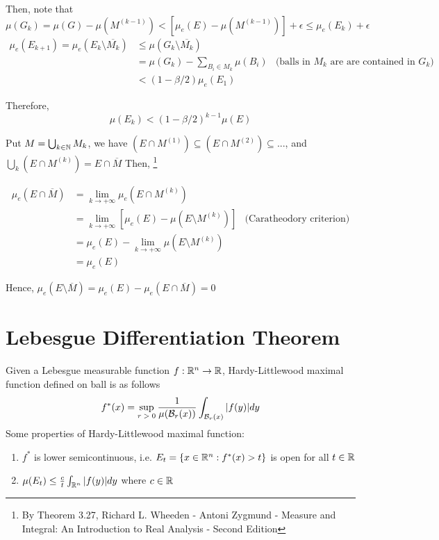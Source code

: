 \documentclass{report}
\begin{document}
Then, note that $\mu(G_k) = \mu(G) - \mu(M^{(k-1)}) < [\mu_e(E) - \mu(M^{(k-1)})] + \epsilon \leq \mu_e(E_k) + \epsilon$
\begin{align*}
    \mu_e(E_{k+1}) = \mu_e\left( E_k \setminus \overline{M_k} \right)
    &\leq \mu\left( G_k \setminus \overline{M_k} \right) \\
    &= \mu(G_k) - \sum_{B_i \in M_k} \mu(B_i) &\text{(balls in $M_k$ are are contained in $G_k$)} \\
    &< (1 - \beta/2) \mu_e(E_1)
\end{align*}

Therefore,
\[
    \mu(E_k) < (1 - \beta/2)^{k-1} \mu(E)
\]

Put $M = \bigcup_{k \in \mathbb{N}} M_k$, we have $(E \cap M^{(1)}) \subseteq (E \cap M^{(2)}) \subseteq ...$, and $\bigcup_{k} (E \cap M^{(k)}) = E \cap \overline{M}$
Then, \footnote{By Theorem 3.27, Richard L. Wheeden - Antoni Zygmund - Measure and Integral: An Introduction to Real Analysis - Second Edition}

\begin{align*}
    \mu_e(E \cap \overline{M})
    &= \lim_{k \to +\infty} \mu_e(E \cap M^{(k)}) \\
    &= \lim_{k \to +\infty} [\mu_e(E) - \mu(E \setminus M^{(k)})] &\text{(Caratheodory criterion)} \\
    &= \mu_e(E) - \lim_{k \to +\infty}  \mu(E \setminus M^{(k)}) \\
    &= \mu_e(E)
\end{align*}

Hence, $\mu_e(E \setminus \overline{M}) = \mu_e(E) - \mu_e(E \cap \overline{M}) = 0$


\section{Lebesgue Differentiation Theorem}

\begin{lemma}
    Given a Lebesgue measurable function $f: \mathbb{R}^n \to \mathbb{R}$, Hardy-Littlewood maximal function defined on ball is as follows
    \[
        f^*(x) = \sup_{\text{$r > 0$}} \frac{1}{\mu(\mathcal{B}_r(x))} \int_{\mathcal{B}_r(x)} |f(y)|dy
    \]
    Some properties of Hardy-Littlewood maximal function:
    \begin{enumerate}
        \item $f^*$ is lower semicontinuous, i.e. $E_t = \{x \in \mathbb{R}^n: f^*(x) > t \}$ is open for all $t \in \mathbb{R}$
        \item $\mu(E_t) \leq \frac{c}{t} \int_{\mathbb{R}^n} |f(y)|dy$ where $c \in \mathbb{R}$ 
    \end{enumerate}
\end{lemma}
\end{document}
